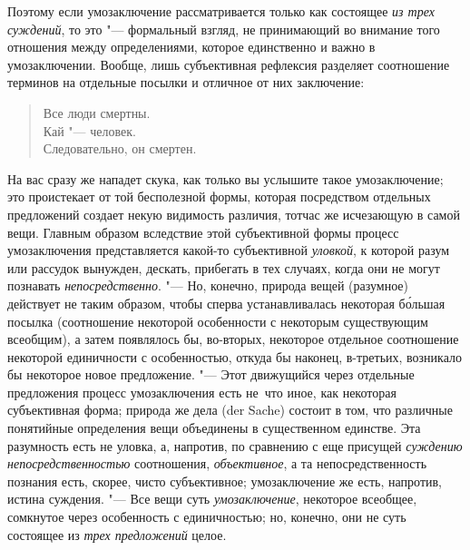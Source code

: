 Поэтому если умозаключение рассматривается только как
состоящее {\em из трех суждений},
то это "--- формальный взгляд, не принимающий во
внимание того отношения между определениями, которое единственно и важно в
умозаключении. Вообще, лишь субъективная рефлексия разделяет соотношение
терминов на отдельные посылки и отличное от них заключение:

\begin{verse}
Все люди смертны.\\
Кай "--- человек.\\
Следовательно, он смертен.
\end{verse}

На вас сразу же нападет скука, как только вы услышите такое
умозаключение; это проистекает от той бесполезной формы, которая
посредством отдельных предложений создает некую видимость различия, тотчас
же исчезающую в самой вещи. Главным образом вследствие этой субъективной
формы процесс умозаключения представляется какой-то субъективной
{\em уловкой}, к которой разум или рассудок вынужден, дескать, прибегать
в тех случаях, когда они не могут познавать {\em непосредственно}.
"--- Но, конечно, природа вещей (разумное) действует не таким
образом, чтобы сперва устанавливалась некоторая б\'{о}льшая посылка
(соотношение некоторой особенности с некоторым существующим всеобщим), а
затем появлялось бы, во-вторых, некоторое отдельное соотношение некоторой
единичности с особенностью, откуда бы наконец, в-третьих, возникало бы
некоторое новое предложение. "--- \label{bkm:bm52a}Этот
движущийся через отдельные предложения процесс умозаключения есть
не~что иное, как некоторая субъективная форма; природа же дела (der Sache)
состоит в том, что различные понятийные определения вещи объединены в
существенном единстве. Эта разумность есть не уловка, а, напротив, по сравнению
с еще присущей {\em суждению непосредственностью} соотношения, {\em
объективное}, а та непосредственность познания есть, скорее, чисто
субъективное; умозаключение же есть, напротив, истина суждения. "--- Все вещи
суть {\em умозаключение}, некоторое всеобщее, сомкнутое через особенность с
единичностью; но, конечно, они не суть состоящее из {\em трех предложений}
целое.

